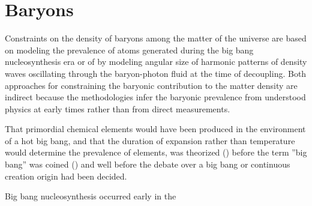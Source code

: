 \documentclass{paper}
\begin{document}
\section{Baryons}
  Constraints on the density of baryons among the matter of the universe are
  based on modeling the prevalence of atoms generated during the big bang 
  nucleosynthesis era or of by modeling angular size of harmonic patterns of
  density waves oscillating through the baryon-photon fluid at the time of
  decoupling. Both approaches for constraining the baryonic contribution
  to the matter density are indirect because the methodologies infer the 
  baryonic prevalence from understood physics at early times rather than
  from direct measurements.

  That primordial chemical elements would have been produced in the 
  environment of a hot big bang, and that the duration of expansion rather 
  than temperature would determine the prevalence of elements, was theorized 
  (\cite{PhysRev.73.803}) before the term ''big bang'' was coined 
  (\cite{Hoyle1949}) and well before the debate over a big bang or continuous 
  creation origin had been decided.

  Big bang nucleosynthesis occurred early in the 
\end{document}
